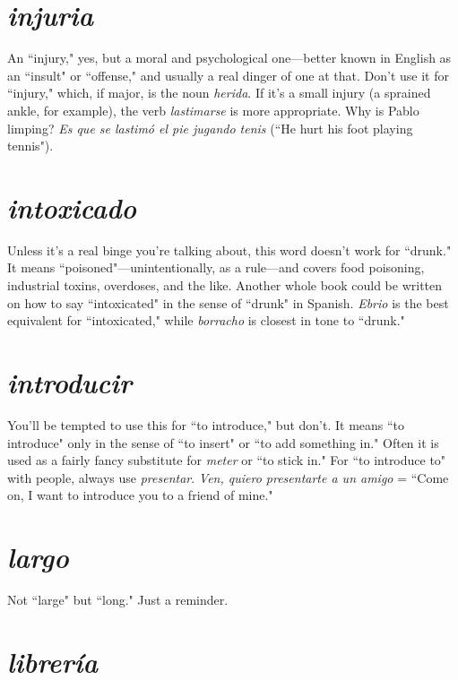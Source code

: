 \section{\emph{injuria}}

An ``injury," yes, but a moral and psychological
one---better known in English as an ``insult" or ``offense," and usually
a real dinger of one at that. Don't use it for ``injury," which, if major, is
the noun \emph{herida}. If it's a small injury (a sprained ankle, for example),
the verb \emph{lastimarse} is more appropriate. Why is Pablo limping? \emph{Es que
se lastimó el pie jugando tenis} (``He hurt his foot playing tennis").

\section{\emph{intoxicado}}

Unless it's a real binge you're talking about,
this word doesn't work for ``drunk." It means ``poisoned"---unintentionally, as a rule---and covers food poisoning, industrial toxins, overdoses, and the like. Another whole book could be written on how to
say ``intoxicated" in the sense of ``drunk" in Spanish. \emph{Ebrio} is the
best equivalent for ``intoxicated," while \emph{borracho} is closest in tone to ``drunk."

\section{\emph{introducir}}

You'll be tempted to use this for ``to introduce,"
but don't. It means ``to introduce" only in the sense of ``to insert" or
``to add something in." Often it is used as a fairly fancy substitute for
\emph{meter} or ``to stick in." For ``to introduce to" with people, always use
\emph{presentar}. \emph{Ven, quiero presentarte a un amigo} = ``Come on, I want to
introduce you to a friend of mine."

\section{\emph{largo}}

Not ``large" but ``long." Just a reminder.

\section{\emph{librería}}

